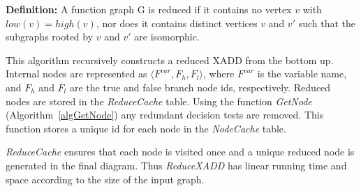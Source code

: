 \documentclass[twoside,11pt]{article}
\begin{document}
\textbf{Definition:} A function graph G is reduced if it contains no vertex $v$ with $low(v)=high(v)$, nor does it contains distinct vertices $v$ and $v′$ such that the subgraphs rooted by $v$ and $v′$ are isomorphic.

This algorithm recursively constructs a reduced XADD from the bottom up. Internal nodes are represented as $\langle F^{\mathit{var}}, F_h, F_l \rangle$, where $F^{\mathit{var}}$ is the variable name, and $F_h$ and $F_l$ are the true and false branch node ids, respectively. Reduced nodes are stored in the \emph{ReduceCache} table.
Using the function \emph{GetNode} (Algorithm~\ref{algGetNode}) any redundant decision tests are removed. This function stores a unique id for each node in the \emph{NodeCache} table. 

\emph{ReduceCache} ensures that each node is visited once and a unique reduced node is generated in the final diagram. Thus \emph{ReduceXADD} has linear running time and space according to the size of the input graph. 
\end{document}

